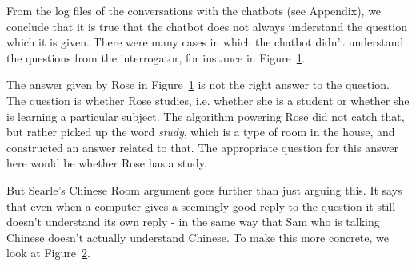From the log files of the conversations with the chatbots (see Appendix), we conclude that it is true that the chatbot does not always understand the question which it is given. There were many cases in which the chatbot didn’t understand the questions from the interrogator, for instance in Figure~\ref{Example1}.

\begin{figure}[ht]
   \begin{center}
   \end{center}
   \caption{}
   \label{Example1}
\end{figure}

The answer given by Rose in Figure~\ref{Example1} is not the right answer to the question. The question is whether Rose studies, i.e. whether she is a student or whether she is learning a particular subject. The algorithm powering Rose did not catch that, but rather picked up the word \textit{study}, which is a type of room in the house, and constructed an answer related to that. The appropriate question for this answer here would be whether Rose has a study.

     But Searle’s Chinese Room argument goes further than just arguing this. It says that even when a computer gives a seemingly good reply to the question it still doesn’t understand its own reply - in the same way that Sam who is talking Chinese doesn’t actually understand Chinese. To make this more concrete, we look at Figure~\ref{Example2}.

\begin{figure}[ht]
   \begin{center}
   \end{center}
   \caption{}
   \label{Example2}
\end{figure}


